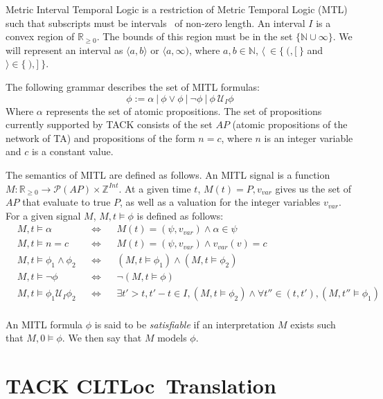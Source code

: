 \documentclass[a4paper,11pt]{report}
\theoremstyle{definition}
\newcommand{\cltloc}{CLTLoc}
\begin{document}
Metric Interval Temporal Logic is a restriction of Metric Temporal Logic (MTL)
such that subscripts must be intervals~\cite{Alur91thebenefits} of non-zero
length. An interval $I$ is a convex region of $\mathbb{R}_{\geq 0}$. The bounds
of this region must be in the set $\{\mathbb{N} \cup \infty\}$. We will
represent an interval as $\langle a,b \rangle$ or $\langle a,\infty )$, where
$a,b \in \mathbb{N}$, $\langle\ \in \{\ (,[\ \}$ and $\rangle \in \{\ ),]\ \}$.

The following grammar describes the set of MITL formulas:
\[\phi := \alpha\ |\ \phi \lor \phi\ |\ \neg \phi\ |\ \phi\ \mathcal{U}_{I} \phi\]
Where $\alpha$ represents the set of atomic propositions. The set of
propositions currently supported by TACK consists of the set $AP$ (atomic
propositions of the network of TA) and propositions of the form $n = c$, where
$n$ is an integer variable and $c$ is a constant value.

The semantics of MITL are defined as follows. An MITL signal is a function
$M : \mathbb{R}_{\geq 0} \rightarrow \mathcal{P}(AP) \times \mathbb{Z}^{Int}$.
At a given time $t$, $M(t) = P, v_{var}$ gives us the set of $AP$ that evaluate
to true $P$, as well as a valuation for the integer variables $v_{var}$. For a
given signal $M$, $M,t \vDash \phi$ is defined as follows:
\begin{align*}
  &M,t \vDash \alpha && \Leftrightarrow && M(t) = (\psi,v_{var}) \land \alpha \in \psi \\
  &M,t \vDash n = c && \Leftrightarrow && M(t) = (\psi,v_{var}) \land v_{var}(v) = c \\
  &M,t \vDash \phi_{1} \land \phi_{2} && \Leftrightarrow && (M,t \vDash \phi_{1}) \land (M,t \vDash \phi_{2}) \\
  &M,t \vDash \neg \phi && \Leftrightarrow && \neg (M,t \vDash \phi) \\
  &M,t \vDash \phi_{1} \mathcal{U}_{I} \phi_{2} && \Leftrightarrow && \exists t' > t, t' - t \in I, (M,t \vDash \phi_{2}) \land \forall t'' \in (t,t'), (M,t'' \vDash \phi_{1}) \\
\end{align*}

An MITL formula $\phi$ is said to be \emph{satisfiable} if an interpretation
$M$ exists such that $M,0 \vDash \phi$. We then say that $M$ models $\phi$.


\section{TACK \cltloc\ Translation}\label{prelim-tack}
\end{document}
